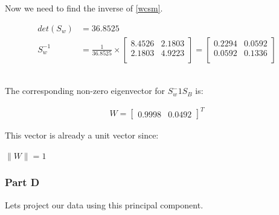 \documentclass[12pt]{article}
\begin{document}
Now we need to find the inverse of \ref{wcsm}.
\begin{center}

\begin{align*}
det(S_{w}) &= 36.8525\\
S_{w}^{-1} &= \frac{1}{36.8525} \times \begin{bmatrix}
8.4526 & 2.1803\\
2.1803 & 4.9223\\
\end{bmatrix}
=
\begin{bmatrix}
0.2294 & 0.0592\\
0.0592  & 0.1336\\
\end{bmatrix}
\end{align*}
\\[0.1 in]
\end{center}

The corresponding non-zero eigenvector for $S_{w}^-1S_{B}$ is:
\begin{center}
\begin{align}
W = \begin{bmatrix}
0.9998 & 0.0492
\end{bmatrix}^{T} \label{eigen}
\end{align}
\end{center}

This vector is already a unit vector since:
\begin{center}
$
\parallel W \parallel = 1
$
\end{center}


\subsubsection{Part D}
Lets project our data using this principal component.
\end{document}
